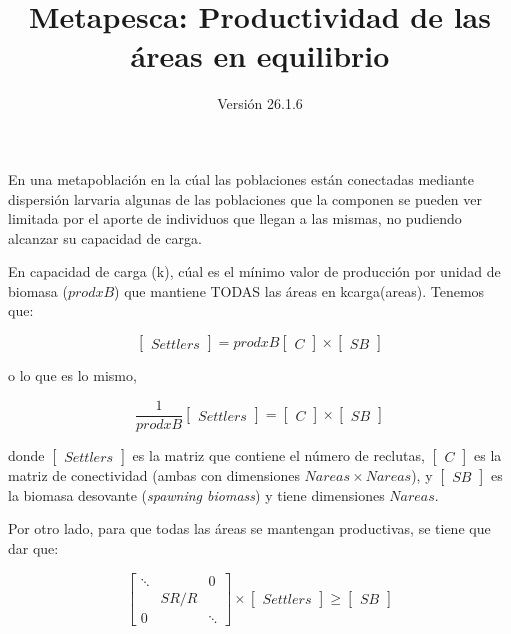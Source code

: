 \documentclass[12pt, oneside, a4paper]{article}
\title{Metapesca: Productividad de las áreas en equilibrio}
\author{Versión 26.1.6}
\begin{document}
 \maketitle

En una metapoblación en la cúal las poblaciones están conectadas mediante dispersión larvaria algunas de las poblaciones que la componen se pueden ver limitada por el aporte de individuos que llegan a las mismas, no pudiendo alcanzar su capacidad de carga. 

En capacidad de carga (k), cúal es el mínimo valor de producción por unidad de biomasa ($prodxB$) que mantiene TODAS las áreas en kcarga(areas). Tenemos que:

\begin{equation}\label{Settlers}
   \begin{bmatrix} Settlers\end{bmatrix} =  prodxB \begin{bmatrix} C \end{bmatrix} \times \begin{bmatrix} SB \end{bmatrix}
\end{equation}

o lo que es lo mismo, 

\begin{equation}\label{Settlers Modificada}
   \frac{1}{prodxB} \begin{bmatrix} Settlers\end{bmatrix} =  \begin{bmatrix} C \end{bmatrix} \times \begin{bmatrix} SB \end{bmatrix}
\end{equation}

donde $\begin{bmatrix} Settlers\end{bmatrix}$ es la matriz que contiene el número de reclutas, $\begin{bmatrix} C \end{bmatrix}$ es la matriz de conectividad (ambas con dimensiones $Nareas \times Nareas$), y $\begin{bmatrix} SB \end{bmatrix}$ es la biomasa desovante (\emph{spawning biomass}) y tiene dimensiones $Nareas$. 

Por otro lado, para que todas las áreas se mantengan productivas, se tiene que dar que:

\begin{equation}\label{Produccion por recluta}
   \begin{bmatrix} \ddots& & 0 \\ & SR/R & \\ 0 & & \ddots\end{bmatrix} \times \begin{bmatrix} Settlers\end{bmatrix} \geq \begin{bmatrix} SB \end{bmatrix}
\end {equation}
\end{document}
